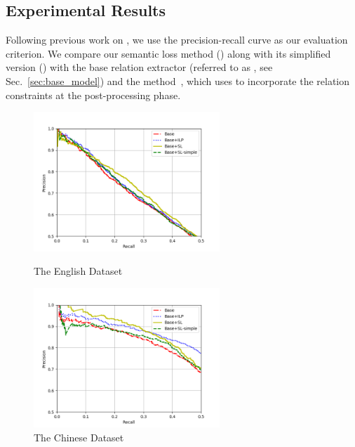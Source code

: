 \subsection{Experimental Results}
Following previous work on \RE, we use the precision-recall curve as our evaluation criterion.
We compare our semantic loss method (\SL) along with its simplified version (\SLsimple) with the base relation extractor (referred to as \base, see Sec.~\ref{sec:base_model}) and the \ILP method~\cite{chen2014encoding}, which uses \ILP to incorporate the relation constraints at the post-processing phase.
\begin{figure}[h]
	\centering
	\begin{minipage}[t]{0.45\textwidth}
		\centering
		\includegraphics[width=7cm]{./result-figure/DBpedia-CNN-result.png}
		\caption{The English Dataset}
		\label{fig:dbpedia}
	\end{minipage}
	\begin{minipage}[t]{0.45\textwidth}
		\centering
		\includegraphics[width=7cm]{./result-figure/Chinese-CNN-result.png}
		\caption{The Chinese Dataset}
		\label{fig:chinese}
	\end{minipage}
\end{figure}

